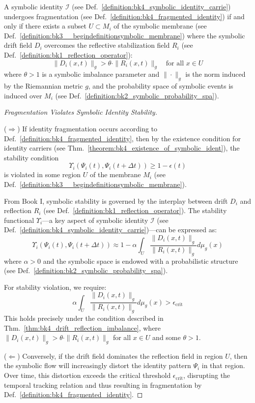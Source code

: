 \begin{theorem} \label{thm:bk4_drift_reflection_imbalance}
A symbolic identity $\mathcal{I}$ (see Def.~\ref{definition:bk4_symbolic_identity_carrie}) undergoes fragmentation (see Def.~\ref{definition:bk4_fragmented_identity}) if and only if there exists a subset $U \subset M_i$ of the symbolic membrane (see Def.~\ref{definition:bk3__begindefinitionsymbolic_membrane}) where the symbolic drift field $D_i$ overcomes the reflective stabilization field $R_i$ (see Def.~\ref{definition:bk1_reflection_operator}):
\begin{equation}
    \|D_i(x,t)\|_g > \theta \cdot \|R_i(x,t)\|_g \quad \text{for all } x \in U
\end{equation}
where $\theta > 1$ is a symbolic imbalance parameter and $\|\cdot\|_g$ is the norm induced by the Riemannian metric $g$, and the probability space of symbolic events is induced over $M_i$ (see Def.~\ref{definition:bk2_symbolic_probability_spa}).
\end{theorem}
\begin{proof}[Fragmentation Violates Symbolic Identity Stability]
\label{proof:bk4_fragmentation_identity_stability}

($\Rightarrow$) If identity fragmentation occurs according to Def.~\ref{definition:bk4_fragmented_identity}, then by the existence condition for identity carriers (see Thm.~\ref{theorem:bk4_existence_of_symbolic_ident}), the stability condition 
\[
\Upsilon_i(\Psi_i(t), \Psi_i(t+\Delta t)) \geq 1 - \epsilon(t)
\]
is violated in some region $U$ of the membrane $M_i$ (see Def.~\ref{definition:bk3__begindefinitionsymbolic_membrane}).

From Book I, symbolic stability is governed by the interplay between drift $D_i$ and reflection $R_i$ (see Def.~\ref{definition:bk1_reflection_operator}). The stability functional $\Upsilon_i$—a key aspect of symbolic identity $\mathcal{I}$ (see Def.~\ref{definition:bk4_symbolic_identity_carrie})—can be expressed as:
\[
\Upsilon_i(\Psi_i(t), \Psi_i(t+\Delta t)) \approx 1 - \alpha \int_U \frac{\|D_i(x,t)\|_g}{\|R_i(x,t)\|_g} d\mu_g(x)
\]
where $\alpha > 0$ and the symbolic space is endowed with a probabilistic structure (see Def.~\ref{definition:bk2_symbolic_probability_spa}).

For stability violation, we require:
\[
\alpha \int_U \frac{\|D_i(x,t)\|_g}{\|R_i(x,t)\|_g} d\mu_g(x) > \epsilon_{\text{crit}}
\]
This holds precisely under the condition described in Thm.~\ref{thm:bk4_drift_reflection_imbalance}, where $\|D_i(x,t)\|_g > \theta \cdot \|R_i(x,t)\|_g$ for all $x \in U$ and some $\theta > 1$.

($\Leftarrow$) Conversely, if the drift field dominates the reflection field in region $U$, then the symbolic flow will increasingly distort the identity pattern $\Psi_i$ in that region. Over time, this distortion exceeds the critical threshold $\epsilon_{\text{crit}}$, disrupting the temporal tracking relation and thus resulting in fragmentation by Def.~\ref{definition:bk4_fragmented_identity}.

\end{proof}
